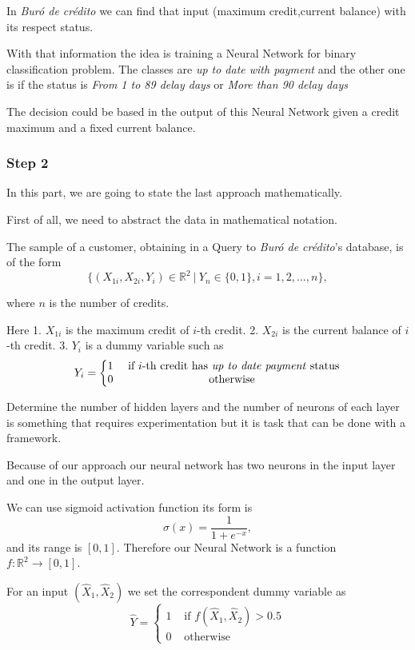 \documentclass[11pt]{article}
\begin{document}
In \emph{Buró de crédito} we can find that input (maximum credit,current
balance) with its respect status.

With that information the idea is training a Neural Network for binary
classification problem. The classes are \emph{up to date with payment}
and the other one is if the status is \emph{From 1 to 89 delay days} or
\emph{More than 90 delay days}

The decision could be based in the output of this Neural Network given a
credit maximum and a fixed current balance.

    \hypertarget{step-2}{%
\subsubsection{Step 2}\label{step-2}}

In this part, we are going to state the last approach mathematically.

First of all, we need to abstract the data in mathematical notation.

The sample of a customer, obtaining in a Query to \emph{Buró de
crédito}'s database, is of the form
\[\{(X_{1i},X_{2i},Y_i)\in \mathbb{R}^2\ |\ Y_n\in\{0,1\},i=1,2,\dots,n\},\]

where \(n\) is the number of credits.

Here 1. \(X_{1i}\) is the maximum credit of \(i\)-th credit. 2.
\(X_{2i}\) is the current balance of \(i\)-th credit. 3. \(Y_i\) is a
dummy variable such as
\[Y_i=\left\lbrace\begin{matrix}1&\text{ if }i\text{-th credit has \textit{up to date payment} status}\\
0&\text{otherwise}\end{matrix}\right.\]

Determine the number of hidden layers and the number of neurons of each
layer is something that requires experimentation but it is task that can
be done with a framework.

Because of our approach our neural network has two neurons in the input
layer and one in the output layer.

We can use sigmoid activation function its form is
\[ \sigma(x)=\frac{1}{1+e^{-x}},\] and its range is \([0,1]\). Therefore
our Neural Network is a function \(f:\mathbb{R}^2\to [0,1]\).

For an input \((\hat{X}_1,\hat{X}_2)\) we set the correspondent dummy
variable as
\[\hat{Y}=\left\lbrace\begin{matrix}1&\text{ if }f(\hat{X}_1,\hat{X}_2)>0.5\\ 0&\text{ otherwise }\end{matrix}\right.\]
\end{document}
